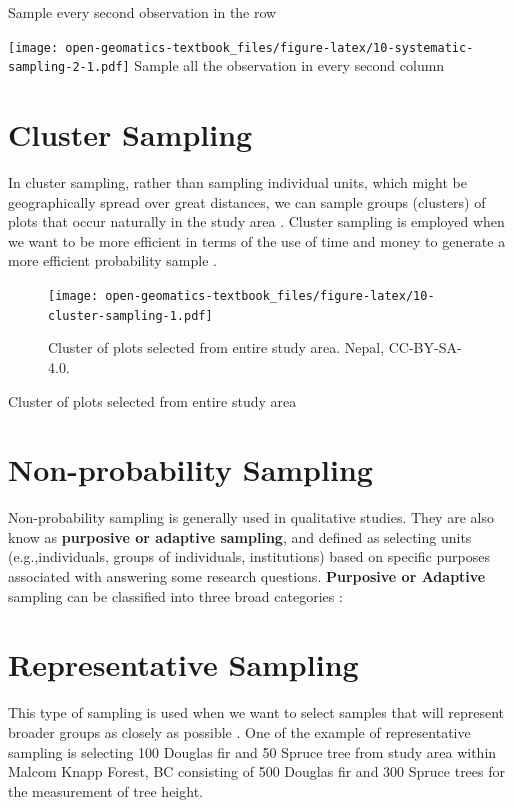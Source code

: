 \documentclass[
]{book}
\begin{document}
Sample every second observation in the row

\texttt{[image: open-geomatics-textbook\_files/figure-latex/10-systematic-sampling-2-1.pdf]}
Sample all the observation in every second column

\hypertarget{cluster-sampling}{%
\section{Cluster Sampling}\label{cluster-sampling}}

In cluster sampling, rather than sampling individual units, which might be geographically spread over great distances, we can sample groups (clusters) of plots that occur naturally in the study area \citep{teddlie_mixed_2007}. Cluster sampling is employed when we want to be more efficient in terms of the use of time and money to generate a more efficient probability sample \citep{teddlie_mixed_2007}.

\begin{figure}
\centering
\texttt{[image: open-geomatics-textbook\_files/figure-latex/10-cluster-sampling-1.pdf]}
\caption{\label{fig:10-cluster-sampling}Cluster of plots selected from entire study area. Nepal, CC-BY-SA-4.0.}
\end{figure}

Cluster of plots selected from entire study area

\hypertarget{non-probability-sampling}{%
\section{Non-probability Sampling}\label{non-probability-sampling}}

Non-probability sampling is generally used in qualitative studies. They are also know as \textbf{purposive or adaptive sampling}, and defined as selecting units (e.g.,individuals, groups of individuals, institutions) based on specific purposes associated with answering some research questions. \textbf{Purposive or Adaptive} sampling can be classified into three broad categories \citep{teddlie_mixed_2007}:

\hypertarget{representative-sampling}{%
\section{Representative Sampling}\label{representative-sampling}}

This type of sampling is used when we want to select samples that will represent broader groups as closely as possible \citep{teddlie_mixed_2007}. One of the example of representative sampling is selecting 100 Douglas fir and 50 Spruce tree from study area within Malcom Knapp Forest, BC consisting of 500 Douglas fir and 300 Spruce trees for the measurement of tree height.
\end{document}
